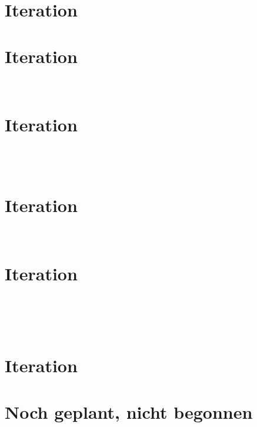 \documentclass
[english,accentcolor=tud1c]
{tudreport}
\begin{document}
	\chapter{Iteration}
	

	\chapter{Iteration}
	\\
	

	\chapter{Iteration}
	\\
	\\
	

	\chapter{Iteration}
	\\
	

	\chapter{Iteration}
	\\
	\\
	\\
	
	
	\chapter{Iteration}


\chapter*{Noch geplant, nicht begonnen}

	\\
\end{document}
